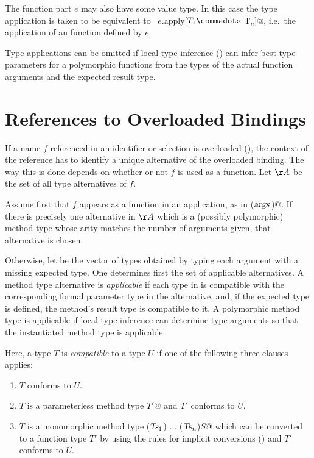 \documentclass[a4paper,12pt,twoside,titlepage]{book}
\newcommand{\args}{\mbox{\sl args}}
\newcommand{\Ts}{\mbox{\sl Ts}}
\begin{document}
The function part $e$ may also have some value type. In this case
the type application is taken to be equivalent to
~\lstinline@$e$.apply[$T_1 \commadots$ T$_n$]@, i.e.\ the
application of an  function defined by $e$.

Type applications can be omitted if local type inference
() can infer best type parameters for a
polymorphic functions from the types of the actual function arguments
and the expected result type.

\section{References to Overloaded Bindings}
\label{sec:overloaded-refs}

If a name $f$ referenced in an identifier or selection is
overloaded (), the context of the reference
has to identify a unique alternative of the overloaded binding. The
way this is done depends on whether or not $f$ is used as a
function.  Let $\AA$ be the set of all type alternatives of
$f$.

Assume first that $f$ appears as a function in an application, as
in \lstinline@f($\args\,$)@.  If there is precisely one alternative in
$\AA$ which is a (possibly polymorphic) method type whose arity
matches the number of arguments given, that alternative is chosen.

Otherwise, let  be the vector of types obtained by
typing each argument with a missing expected type. One determines
first the set of applicable alternatives. A method type alternative is
{\em applicable} if each type in  is compatible with
the corresponding formal parameter type in the alternative, and, if 
the expected type is defined, the method's result type is compatible to
it.  A polymorphic method type is applicable if local type inference
can determine type arguments so that the instantiated method type is
applicable.

Here, a type $T$ is {\em compatible} to a type $U$ if one of the
following three clauses applies:
\begin{enumerate}
\item
$T$ conforms to $U$.
\item
$T$ is a parameterless method type \lstinline@[]$T'$@ and $T'$
conforms to $U$.
\item 
$T$ is a monomorphic method type \lstinline@($\Ts_1$) $\ldots$ ($\Ts_n$)$S$@ which
can be converted to a function type $T'$ by using the rules for
implicit conversions () and $T'$ conforms to
$U$.
\end{enumerate}
\end{document}
